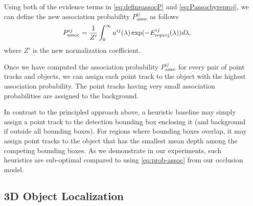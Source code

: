 Using both of the evidence terms in \eqref{eq:defineassocP} and \eqref{eq:Passocbyreproj}, we can define the new association probability $P^{ij}_{\text{assoc}}$ as follows
\begin{align}
  P^{ij}_{\text{assoc}} = \frac{1}{Z'}\int_0^{\infty} a^{ij}(\lambda) \exp(-E^{ij}_{\text{reproj}}(\lambda))d\lambda,
  \label{eq:prob-assoc}
\end{align}
where $Z'$ is the new normalization coefficient.

Once we have computed the association probability $P^{ij}_{\text{assoc}}$ for every pair of point tracks and objects, we can assign each point track to the object with the highest association probability. The point tracks having very small association probabilities are assigned to the background.

In contrast to the principled approach above, a heuristic baseline may simply assign a point track to the detection bounding box enclosing it (and background if outside all bounding boxes). For regions where bounding boxes overlap, it may assign point tracks to the object that has the smallest mean depth among the competing bounding boxes. As we demonstrate in our experiments, such heuristics are sub-optimal compared to using \eqref{eq:prob-assoc} from our occlusion model.




\subsection{3D Object Localization}
\label{sec:localization}



